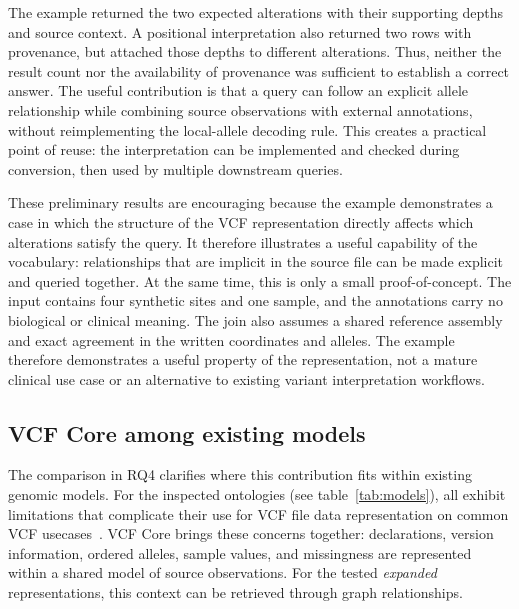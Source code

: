 The example returned the two expected alterations with their supporting depths and source context.
A positional interpretation also returned two rows with provenance, but attached those depths to different alterations.
Thus, neither the result count nor the availability of provenance was sufficient to establish a correct answer.
The useful contribution is that a query can follow an explicit allele relationship while combining source observations with external annotations, without reimplementing the local-allele decoding rule.
This creates a practical point of reuse: the interpretation can be implemented and checked during conversion, then used by multiple downstream queries.

These preliminary results are encouraging because the example demonstrates a case in which the structure of the VCF representation directly affects which alterations satisfy the query. 
It therefore illustrates a useful capability of the vocabulary: relationships that are implicit in the source file can be made explicit and queried together.
At the same time, this is only a small proof-of-concept. 
The input contains four synthetic sites and one sample, and the annotations carry no biological or clinical meaning. 
The join also assumes a shared reference assembly and exact agreement in the written coordinates and alleles. 
The example therefore demonstrates a useful property of the representation, not a mature clinical use case or an alternative to existing variant interpretation workflows.


\subsection{VCF Core among existing models}

The comparison in RQ4 clarifies where this contribution fits within existing genomic models.
For the inspected ontologies (see table~\ref{tab:models}), all exhibit limitations that complicate their use for VCF file data representation on common VCF usecases~\cite{baran2015gfvo,cazzaro2025hero,kawashima2023gvo,penha2017vcf2rdf}.
VCF Core brings these concerns together: declarations, version information, ordered alleles, sample values, and missingness are represented within a shared model of source observations.
For the tested \textit{expanded} representations, this context can be retrieved through graph relationships.

